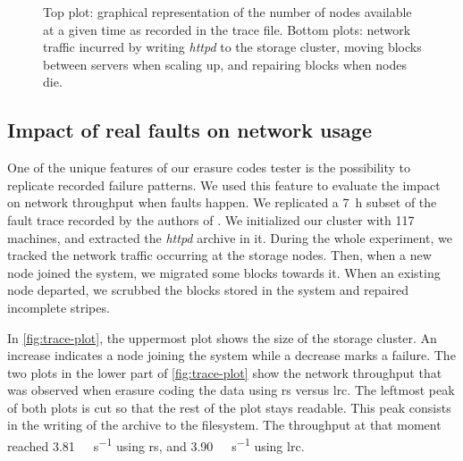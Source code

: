 \begin{figure*}
    \centering
    
    \caption{Top plot: graphical representation of the number of nodes available at a given time as recorded in the trace file. Bottom plots: network traffic incurred by writing \textit{httpd} to the storage cluster, moving blocks between servers when scaling up, and repairing blocks when nodes die.}
    \label{fig:trace-plot}
\end{figure*}

\subsection{Impact of real faults on network usage}
\label{subsec:fault-trace}

One of the unique features of our erasure codes tester is the possibility to replicate recorded failure patterns.
We used this feature to evaluate the impact on network throughput when faults happen.
We replicated a \SI{7}{\hour} subset of the fault trace recorded by the authors of \autocite{websites02}.
We initialized our cluster with 117 machines, and extracted the \textit{httpd} archive in it.
During the whole experiment, we tracked the network traffic occurring at the storage nodes.
Then, when a new node joined the system, we migrated some blocks towards it.
When an existing node departed, we scrubbed the blocks stored in the system and repaired incomplete stripes.

In \autoref{fig:trace-plot}, the uppermost plot shows the size of the storage cluster.
An increase indicates a node joining the system while a decrease marks a failure.
The two plots in the lower part of \autoref{fig:trace-plot} show the network throughput that was observed when erasure coding the data using \ac{rs} versus \ac{lrc}.
The leftmost peak of both plots is cut so that the rest of the plot stays 
readable.
This peak consists in the writing of the archive to the filesystem.
The throughput at that moment reached \SI{3.81}{\mega\byte\per\second} using 
\ac{rs}, and \SI{3.90}{\mega\byte\per\second} using \ac{lrc}.
